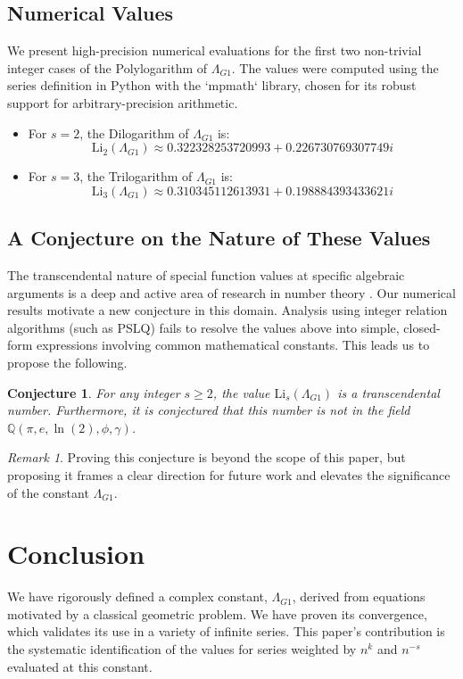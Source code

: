 \documentclass{amsart}
\theoremstyle{plain}
\newtheorem{conjecture}[theorem]{Conjecture}
\theoremstyle{definition}
\theoremstyle{remark}
\newtheorem*{remark}{Remark}
\newcommand{\LambdaG}{\Lambda_{G1}}
\begin{document}
\subsection{Numerical Values}
We present high-precision numerical evaluations for the first two non-trivial integer cases of the Polylogarithm of $\LambdaG$. The values were computed using the series definition in Python with the `mpmath` library, chosen for its robust support for arbitrary-precision arithmetic.
\begin{itemize}
    \item For $s=2$, the Dilogarithm of $\LambdaG$ is:
    $$ \mathrm{Li}_2(\LambdaG) \approx 0.322328253720993 + 0.226730769307749i $$
    \item For $s=3$, the Trilogarithm of $\LambdaG$ is:
    $$ \mathrm{Li}_3(\LambdaG) \approx 0.310345112613931 + 0.198884393433621i $$
\end{itemize}

\subsection{A Conjecture on the Nature of These Values}
The transcendental nature of special function values at specific algebraic arguments is a deep and active area of research in number theory \cite{Lewin}. Our numerical results motivate a new conjecture in this domain. Analysis using integer relation algorithms (such as PSLQ) fails to resolve the values above into simple, closed-form expressions involving common mathematical constants. This leads us to propose the following.

\begin{conjecture}
For any integer $s \ge 2$, the value $\mathrm{Li}_s(\LambdaG)$ is a transcendental number. Furthermore, it is conjectured that this number is not in the field $\mathbb{Q}(\pi, e, \ln(2), \phi, \gamma)$.
\end{conjecture}
\begin{remark}
Proving this conjecture is beyond the scope of this paper, but proposing it frames a clear direction for future work and elevates the significance of the constant $\LambdaG$.
\end{remark}

\section{Conclusion}
We have rigorously defined a complex constant, $\LambdaG$, derived from equations motivated by a classical geometric problem. We have proven its convergence, which validates its use in a variety of infinite series. This paper's contribution is the systematic identification of the values for series weighted by $n^k$ and $n^{-s}$ evaluated at this constant.
\end{document}
